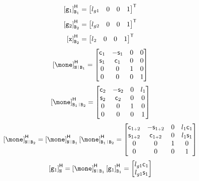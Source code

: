 \documentclass[a4paper,11pt,brazil,fleqn]{article}
\begin{document}
\begin{itemize}
\begin{equation}
\left[ \mathtt{g}_1 \right]^\mathsf{H}_{\mathtt{B}_1}  =
\begin{bmatrix} 
l_{g1} & 0 & 0 & 1
\end{bmatrix}^{\mathsf{T}}
\end{equation}
\begin{equation}
\left[ \mathtt{g}_2 \right]^\mathsf{H}_{\mathtt{B}_2}  =
\begin{bmatrix} 
l_{g2} & 0 & 0 & 1
\end{bmatrix}^{\mathsf{T}}
\end{equation}
\begin{equation}
\left[ \mathtt{x} \right]^\mathsf{H}_{\mathtt{B}_2}  =
\begin{bmatrix} 
l_2 & 0 & 0 & 1
\end{bmatrix}^{\mathsf{T}}
\end{equation}
\begin{equation}
\hvct{\mone}_{\ttN \rl \ttB_1} =
\begin{bmatrix}
\ccos_1 & -\ssin_1 & 0 & 0 \\
\ssin_1 & \ccos_1 & 0 & 0 \\
0 & 0 & 1 & 0 \\
0 & 0 & 0 & 1
\end{bmatrix}
\end{equation}
\begin{equation}
\hvct{\mone}_{\ttB_1 \rl \ttB_2} =
\begin{bmatrix}
\ccos_2 & -\ssin_2 & 0 & l_1 \\
\ssin_2 & \ccos_2 & 0 &  0 \\
0 & 0 & 1 & 0\\
0 & 0 & 0 & 1
\end{bmatrix}
\end{equation}
\begin{equation}
\hvct{\mone}_{\ttN \rl \ttB_2} = \hvct{\mone}_{\ttN \rl \ttB_1} \hvct{\mone}_{\ttB_1 \rl \ttB_2} =
\begin{bmatrix}
\ccos_{1\plus 2} & -\ssin_{1\plus 2} & 0 & l_1 \ccos_1\\
\ssin_{1\plus 2} & \ccos_{1\plus 2} & 0 & l_1 \ssin_1 \\
0 & 0 & 1 & 0\\
0 & 0 & 0 & 1
\end{bmatrix}
\end{equation}
\begin{equation}
\hvct{\ttg_1}_{\ttN}  = \hvct{\mone}_{\ttN \rl \ttB_1} \hvct{\ttg_1}_{\ttB_1} =
\begin{bmatrix}
l_{g1} \ccos_1 \\
l_{g1} \ssin_1 \\

\end{bmatrix}
\end{equation}
\end{itemize}
\end{document}
